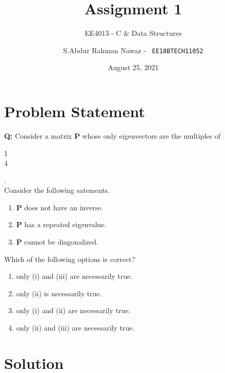 \documentclass{beamer}
\title{Assignment 1}
\subtitle{EE4013 - C \& Data Structures}
\author{
S.Abdur Rahman Nawaz -  \
\texttt{EE18BTECH11052}
}
\institute{IIT HYDERABAD}
\date{August 25, 2021}
\begin{document}
\begin{frame}
  \titlepage
\end{frame}
\section{Problem Statement}

\begin{frame}[fragile]
    
\textbf{Q:} Consider a matrix \textbf{P} whose only eigenvectors are the multiples of 
\begin{bmatrix}
1\\4
\end{bmatrix}.
\\
Consider the following satements.
\begin{enumerate}[i]
    \item \textbf{P} does not have an inverse.
    \item \textbf{P} has a repeated eigenvalue.
    \item \textbf{P} cannot be diagonalized.
\end{enumerate}

Which of the following options is correct?
\begin{enumerate}[A]
    \item only (i) and (iii) are necessarily true.
    \item only (ii) is necessarily true.
    \item only (i) and (ii) are necessarily true.
    \item only (ii) and (iii) are necessarily true.
\end{enumerate}
\end{frame}

\section{Solution}
\end{document}
